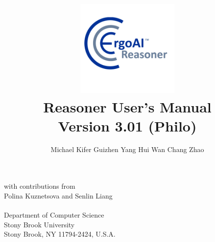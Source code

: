 \documentclass[11pt]{article}
\title{
  \includegraphics[width=2in]{../etc/ergoAI-bigicon-reasoner} 
  \vspace{0.7cm}\\
  \Huge \ERGOAI Reasoner User's Manual
  \vspace{3mm}\\
  {\LARGE Version 3.01 (Philo)}
}
\author{
  Michael Kifer
  \hspace{1cm}
  Guizhen Yang
  \hspace{1cm}
  Hui Wan
  \hspace{1cm}
  Chang Zhao
}
\date{}
\newcommand{\FLORA}{{\mbox{\smaller{\sc ${\cal F}${lora}\rm\emph{-2}}}}\xspace}
\newcommand{\ERGO}{\mbox{\smaller{\ensuremath{\cal{E}}\smaller{{\sc{RGO}}}}}\xspace}
\newcommand{\FLSYSTEM}{\ERGO}
\newcommand{\comment}[1]{}
\newcommand{\FLORAone}{{\mbox{${\cal F}${\sc lora}\emph{-1}}}\xspace}
\newcommand{\FLORID}{{\mbox{\sc Florid}}\xspace}
\newcommand{\fl}{\mbox{F-logic}\xspace}
\begin{document}
\maketitle

\begin{center}
  \large
 with contributions from \\
 \large
 Polina Kuznetsova and Senlin Liang
  \\~\\
  Department of Computer Science\\
  Stony Brook University\\
  Stony Brook, NY 11794-2424, U.S.A.
 \vspace{1.4cm}\\
  \monthname ~\the\year
\end{center}

\thispagestyle{empty}

\newpage

\setcounter{page}{1}

\tableofcontents

\newpage

\setcounter{page}{1}


\comment{
which contains many important extensions and enhancements to \FLORA,
and is proprietary to Coherent Knowledge Systems.
\FLSYSTEM is implemented as a set of run-time
libraries and a compiler that translates a unified language of \fl
\cite{KLW95}, HiLog \cite{hilog-jlp}, Transaction Logic
\cite{trans-chapter-98,trans-tcs94}, and defeasible reasoning
\cite{lpda-iclp-09} into tabled Prolog code.

Applications of \FLSYSTEM include intelligent agents, Semantic Web, ontology
management, integration of information, and others. 

\index{FLIP}
\index{FLORID}
The language of \FLSYSTEM is a dialect of \fl with
numerous extensions, which include a natural way to do meta-programming in
the style of HiLog, logical updates in the style of Transaction
Logic, and a form of \emph{defeasible reasoning} described in
\cite{lpda-iclp-09}. \FLSYSTEM was designed with extensibility and flexibility in mind, and
it provides strong support for modular software development through its unique
feature of on-the-fly modules.
Other extensions, such as the versatile syntax of \FLORID path
expressions, are borrowed from
\FLORID, a C++-based \fl system developed at
Freiburg University.\footnote{
  \url{http://www.informatik.uni-freiburg.de/~dbis/florid/}.
}
Extensions aside, the syntax of \FLSYSTEM differs in many
important ways from \FLORID, from the original version of \fl, as described
in \cite{KLW95}, and from an earlier implementation, \FLORAone. These
syntax changes made the system more user-friendly and practical.

\FLSYSTEM is available at \url{http://flora.sourceforge.net}.
This manual will mostly refer to the system under its traditional name,
\FLSYSTEM.
}
\end{document}
